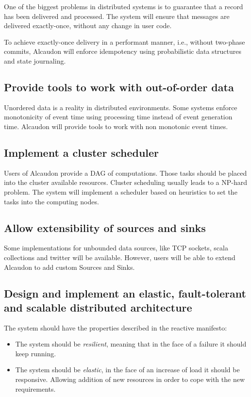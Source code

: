 One of the biggest problems in distributed systems is to guarantee that a record
has been delivered and processed. The system will ensure that messages are
delivered exactly-once, without any change in user code.

To achieve exactly-once delivery in a performant manner, i.e., without two-phase
commits\cite{twophase}, Alcaudon will enforce idempotency using probabilistic
data structures and state journaling.

\subsection{Provide tools to work with out-of-order data}

Unordered data is a reality in distributed environments. Some systems enforce
monotonicity of event time using processing time instead of event
generation time. Alcaudon will provide tools to work with non monotonic event
times.

\subsection{Implement a cluster scheduler}

Users of Alcaudon provide a \acf{DAG} of computations. Those
tasks should be placed into the cluster available resources. Cluster scheduling
usually leads to a NP-hard problem. The system will implement a scheduler based
on heuristics to set the tasks into the computing nodes.


\subsection{Allow extensibility of sources and sinks}
Some implementations for unbounded data sources, like TCP sockets, scala collections
and twitter will be available. However, users will be able to extend Alcaudon to add
custom Sources and Sinks.

\subsection{Design and implement an elastic, fault-tolerant and scalable distributed architecture}
The system should have the properties described in the reactive manifesto\cite{reactivemanifesto}:

\begin{itemize}
  \item The system should be \textit{resilient}, meaning that in the face of a failure it should keep running.
  \item The system should be \textit{elastic}, in the face of an increase of load it
    should be responsive. Allowing addition of new resources in order to cope
    with the new requirements.
\end{itemize}

